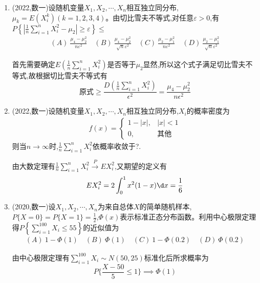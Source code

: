 \documentclass[12pt, a4paper, oneside, UTF8]{ctexbook}
\begin{document}
\begin{enumerate}[label=\arabic*.]
    \item (2022,数一)设随机变量$X_1,X_2,\cdots,X_n$相互独立同分布,$\mu_k=E(X_i^k)(k=1,2,3,4)$。由切比雪夫不等式,对任意$\varepsilon>0$,有
        $P\left\{\left|\frac{1}{n}\sum_{i=1}^n X_i^2-\mu_2\right|\geq\varepsilon\right\}\leq$
    \begin{align*}
        (A)\ \frac{\mu_4-\mu_2^2}{n\varepsilon^2} \quad (B)\ \frac{\mu_4-\mu_2^2}{\sqrt{n}\varepsilon^2} \quad (C)\ \frac{\mu_2-\mu_1^2}{n\varepsilon^2} \quad (D)\ \frac{\mu_2-\mu_1^2}{\sqrt{n}\varepsilon^2}
    \end{align*}
    
    \begin{solution}
    首先需要确定$E(\frac{1}{n}\sum_{i=1}^n X_i^2)$是否等于$\mu_2$显然,所以这个式子满足切比雪夫不等式,故根据切比雪夫不等式有
    \[
    \text{原式}\geq \frac{D(\frac{1}{n}\sum_{i=1}^n X_i^2)}{\epsilon^2}=\frac{\mu_4-\mu_2^2}{n\epsilon^2}
    \]
    \end{solution}
    
    \item (2022,数一)设随机变量$X_1,X_2,\cdots,X_n$相互独立同分布,$X_i$的概率密度为
    \begin{align*}
        f(x)=\begin{cases}
            1-|x|, & |x|<1 \\
            0, & \text{其他}
        \end{cases}
    \end{align*}
    则当$n\rightarrow\infty$时,$\frac{1}{n}\sum_{i=1}^n X_i^2$依概率收敛于?.
    
    \begin{solution}
    由大数定理有$\frac{1}{n}\sum_{i=1}^n X_i^2\xrightarrow{P}EX_i^2$,又期望的定义有
    \[
    EX_i^2=2\int_{0}^{1}x^2(1-x)\d x = \frac{1}{6}
    \]
    \end{solution}
    
    \item (2020,数一)设$X_1,X_2,\cdots,X_n$为来自总体$X$的简单随机样本,$P\{X=0\}=P\{X=1\}=\frac{1}{2}$,$\Phi(x)$表示标准正态分布函数。利用中心极限定理得$P\left\{\sum_{i=1}^{100} X_i\leq 55\right\}$的近似值为
    \begin{align*}
        (A)\ 1-\Phi(1) \quad (B)\ \Phi(1) \quad (C)\ 1-\Phi(0.2) \quad (D)\ \Phi(0.2)
    \end{align*}
    
    \begin{solution}
    由中心极限定理有$\sum_{i=1}^{100} X_i\sim N(50, 25)$标准化后所求概率为 
    \[
    P\{\frac{X-50}{5}\leq 1\} \implies \Phi(1)
    \]
    \end{solution}
\end{enumerate}

\ifx\allfiles\undefined
\end{document}
